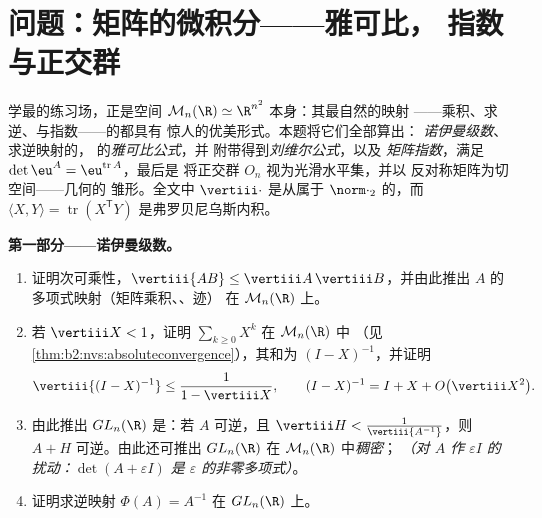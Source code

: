 \section{问题：矩阵的微积分——雅可比，
指数与正交群}

\begin{problem}\label{pb:b2:diffcalc:1}
学最的练习场，正是空间
$\mathcal M_n(\R) \simeq \R^{n^2}$ 本身：其最自然的映射
——乘积、求逆、与指数——的都具有
惊人的优美形式。本题将它们全部算出：
\emph{诺伊曼级数}、求逆映射的，
的\emph{雅可比公式}，并
附带得到\emph{刘维尔公式}，以及
\emph{矩阵指数}，满足
$\det\eu^A = \eu^{\operatorname{tr}A}$，最后是
将正交群 $O_n$ 视为光滑水平集，并以
反对称矩阵为切空间——几何的
雏形。全文中 $\vertiii\cdot$ 是从属于
$\norm\cdot_2$ 的，而 $\langle X, Y\rangle =
\operatorname{tr}(X^{\mathsf T}Y)$ 是弗罗贝尼乌斯内积。

\medskip
\noindent\textbf{第一部分——诺伊曼级数。}
\begin{enumerate}
  \item 证明次可乘性，$\vertiii{AB} \leq
        \vertiii A\,\vertiii B$，并由此推出
        $A$ 的多项式映射（矩阵乘积、、迹）
        在 $\mathcal M_n(\R)$ 上。
  \item 若 $\vertiii X < 1$，证明 $\sum_{k\geq0}X^k$
        在 $\mathcal M_n(\R)$ 中
        （见\cref{thm:b2:nvs:absoluteconvergence}），其和为
        $(I - X)^{-1}$，并证明
        \[
        \vertiii{(I - X)^{-1}} \leq \frac{1}{1 - \vertiii X},
        \qquad
        (I - X)^{-1} = I + X + O\bigl(\vertiii X^2\bigr) .
        \]
  \item 由此推出 $GL_n(\R)$ 是\emph{}：若 $A$
        可逆，且 $\vertiii H <
        \frac{1}{\vertiii{A^{-1}}}$，则 $A + H$
        可逆。由此还可推出 $GL_n(\R)$ 在 $\mathcal M_n(\R)$ 中\emph{稠密}；
        \emph{（对 $A$ 作
        $\varepsilon I$ 的扰动：$\det(A + \varepsilon I)$ 是
        $\varepsilon$ 的非零多项式）}。
  \item 证明求逆映射 $\Phi(A) = A^{-1}$ 在
        $GL_n(\R)$ 上。
\end{enumerate}


\end{problem}
